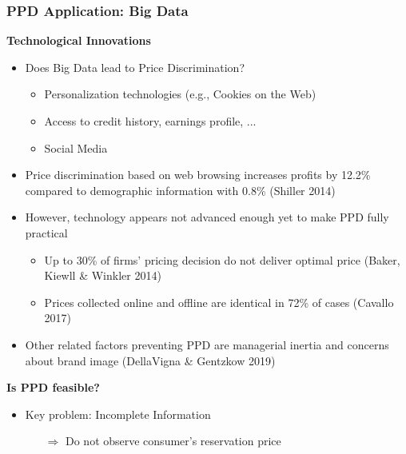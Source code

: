 \documentclass[10pt]{beamer}
\begin{document}
\begin{frame} 
	\frametitle{PPD Application: Big Data}
	
		
	\textbf{Technological Innovations}
	
	\begin{itemize}
		\item Does Big Data lead to Price Discrimination?
		\begin{itemize}
			\item Personalization technologies (e.g., Cookies on the Web)
			\item Access to credit history, earnings profile, ...
			\item Social Media 
		\end{itemize}
		\item Price discrimination based on web browsing increases profits by 12.2\% compared to demographic information with 0.8\% (Shiller 2014)
		\item However, technology appears not advanced enough yet to make PPD fully practical
		\begin{itemize}
			\item Up to 30\% of firms' pricing decision do not deliver optimal price (Baker, Kiewll \& Winkler 2014)
			\item Prices collected online and offline are identical in 72\% of cases (Cavallo 2017)
		\end{itemize}
		\item Other related factors preventing PPD are managerial inertia and concerns about brand image (DellaVigna \& Gentzkow 2019)
	\end{itemize}
	
	\bigskip
\textbf{Is PPD feasible?} 

\begin{itemize}
	\item Key problem: Incomplete Information
	\begin{itemize}
		\item [$\Longrightarrow$] Do not observe consumer's reservation price
	\end{itemize}
\end{itemize}	
	
\end{frame}
\end{document}
